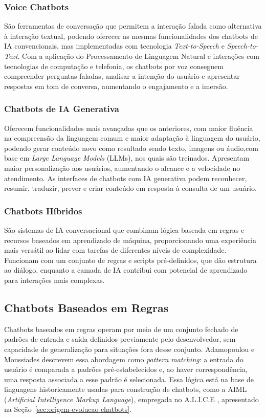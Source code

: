 \subsubsection{Voice Chatbots}
São ferramentas de conversação que permitem a interação falada como alternativa à interação textual, podendo oferecer as mesmas funcionalidades dos chatbots de IA convencionais, mas implementadas com tecnologia \textit{Text-to-Speech} e \textit{Speech-to-Text}. Com a aplicação do Processamento de Linguagem Natural e interações com tecnologias de computação e telefonia, os chatbots por voz conseguem compreender perguntas faladas, analisar a intenção do usuário e apresentar respostas em tom de conversa, aumentando o engajamento e a imersão.

\subsubsection{Chatbots de IA Generativa}
Oferecem funcionalidades mais avançadas que os anteriores, com maior fluência na compreensão da linguagem comum e maior adaptação à linguagem do usuário, podendo gerar conteúdo novo como resultado sendo texto, imagens ou áudio,com base em \textit{Large Language Models} (LLMs), nos quais são treinados. Apresentam maior personalização aos usuários, aumentando o alcance e a velocidade no atendimento. As interfaces de chatbots com IA generativa podem reconhecer, resumir, traduzir, prever e criar conteúdo em resposta à consulta de um usuário.

\subsubsection{Chatbots Híbridos}
São sistemas de IA conversacional que combinam lógica baseada em regras e recursos baseados em aprendizado de máquina, proporcionando uma experiência mais versátil ao lidar com tarefas de diferentes níveis de complexidade. Funcionam com um conjunto de regras e scripts pré-definidos, que dão estrutura ao diálogo, enquanto a camada de IA contribui com potencial de aprendizado para interações mais complexas.

\subsection{Chatbots Baseados em Regras}

Chatbots baseados em regras operam por meio de um conjunto fechado de padrões de entrada e saída definidos previamente pelo desenvolvedor, sem capacidade de generalização para situações fora desse conjunto. Adamopoulou e Moussiades \cite{adamopoulou2020chatbots} descrevem essa abordagem como \textit{pattern matching}: a entrada do usuário é comparada a padrões pré-estabelecidos e, ao haver correspondência, uma resposta associada a esse padrão é selecionada. Essa lógica está na base de linguagens historicamente usadas para construção de chatbots, como a AIML (\textit{Artificial Intelligence Markup Language}), empregada no A.L.I.C.E \cite{wallace2009alice}, apresentado na Seção~\ref{sec:origem-evolucao-chatbots}.

